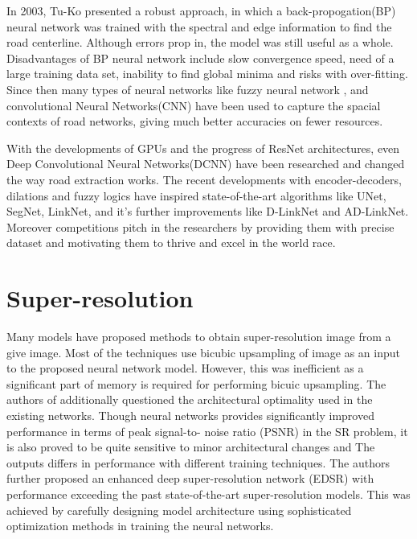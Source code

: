 In 2003, Tu-Ko presented a robust approach, in which a back-propogation(BP) neural network was trained with the spectral and edge information to find the road centerline. Although errors prop in, the model was still useful as a whole. Disadvantages of BP neural network include slow convergence speed, need of a large training data set, inability to find global minima and risks with over-fitting. Since then many types of neural networks like fuzzy neural network \cite{mokhtarzade2008automatic}, and convolutional Neural Networks(CNN) have been used to capture the spacial contexts of road networks, giving much better accuracies on fewer resources. \par

With the developments of GPUs and the progress of ResNet architectures, even Deep Convolutional Neural Networks(DCNN) have been researched and changed the way road extraction works. The recent developments with encoder-decoders, dilations and fuzzy logics have inspired state-of-the-art algorithms like UNet, SegNet, LinkNet, and it's further improvements like D-LinkNet and AD-LinkNet. Moreover competitions pitch in the researchers by providing them with precise dataset and motivating them to thrive and excel in the world race. \par


\section{Super-resolution}
Many models have proposed methods to obtain super-resolution image from a give image. Most of the techniques use bicubic upsampling of image as an input to the proposed neural network model. However, this was inefficient as a significant part of memory is required for performing bicuic upsampling. The authors of %
additionally questioned the architectural optimality used in the existing networks. Though neural networks provides significantly improved performance in terms of peak signal-to- noise ratio (PSNR) in the SR problem, it is also proved to be quite sensitive to minor architectural changes and The outputs differs in performance with different training techniques. The authors further proposed an enhanced deep super-resolution network (EDSR) with performance exceeding the past state-of-the-art super-resolution models. This was achieved by carefully designing model architecture using sophisticated optimization methods in training the neural networks. \par

